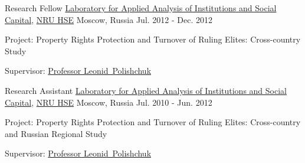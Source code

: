 \begin{cventries}
  \cventry
    {Research Fellow} %
    {\href{http://isc.hse.ru/about_eng}{Laboratory for Applied Analysis of Institutions and Social Capital}, \href{http://www.hse.ru/en/}{NRU HSE}} %
    {Moscow, Russia} %
    {Jul. 2012 - Dec. 2012} %
    {
      \begin{cvitems} %
        \item {Project: Property Rights Protection and Turnover of Ruling Elites: Cross-country Study}
        \item {Supervisor: \href{http://www.hse.ru/en/org/persons/65104}{Professor Leonid~Polishchuk}}
      \end{cvitems}
    }

  \cventry
    {Research Assistant} %
    {\href{http://isc.hse.ru/about_eng}{Laboratory for Applied Analysis of Institutions and Social Capital}, \href{http://www.hse.ru/en/}{NRU HSE}} %
    {Moscow, Russia} %
    {Jul. 2010 - Jun. 2012} %
    {
      \begin{cvitems} %
        \item {Project: Property Rights Protection and Turnover of Ruling Elites: Cross-country and Russian Regional Study}
        \item {Supervisor: \href{http://www.hse.ru/en/org/persons/65104}{Professor Leonid~Polishchuk}}
      \end{cvitems}
    }

\end{cventries}
